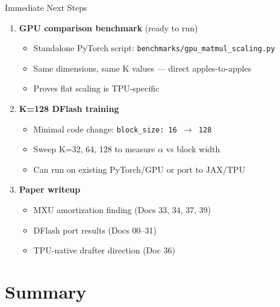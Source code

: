 \documentclass[10pt]{beamer}
\begin{document}
\begin{frame}{Immediate Next Steps}

\begin{enumerate}
  \item \textbf{GPU comparison benchmark} (ready to run)
    \begin{itemize}
      \footnotesize
      \item Standalone PyTorch script: \texttt{benchmarks/gpu\_matmul\_scaling.py}
      \item Same dimensions, same K values --- direct apples-to-apples
      \item Proves flat scaling is TPU-specific
    \end{itemize}

  \vspace{0.3em}
  \item \textbf{K=128 DFlash training}
    \begin{itemize}
      \footnotesize
      \item Minimal code change: \texttt{block\_size: 16 $\rightarrow$ 128}
      \item Sweep K=32, 64, 128 to measure $\alpha$ vs block width
      \item Can run on existing PyTorch/GPU or port to JAX/TPU
    \end{itemize}

  \vspace{0.3em}
  \item \textbf{Paper writeup}
    \begin{itemize}
      \footnotesize
      \item MXU amortization finding (Docs 33, 34, 37, 39)
      \item DFlash port results (Docs 00--31)
      \item TPU-native drafter direction (Doc 36)
    \end{itemize}
\end{enumerate}
\end{frame}

\section{Summary}
\end{document}
